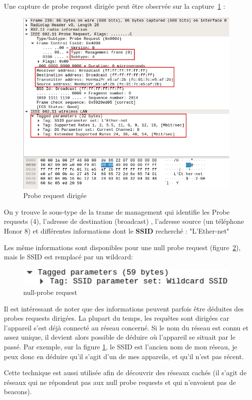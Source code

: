 Une capture de probe request dirigée peut être observée sur la capture~\ref{fig:directedprobe} :
\begin{figure}[H]
	\centering
	\includegraphics[width=14cm]{images/probe/directed_probe.png}
	\caption{Probe request dirigée}
	\label{fig:directedprobe}
\end{figure}

On y trouve le sous-type de la trame de management qui identifie les Probe requests (4), l'adresse de destination (broadcast)
, l'adresse source (un téléphone Honor 8) et différentes informations dont le \textbf{SSID} recherché : "L'Ether-net"

Les même informations sont disponibles pour une null probe request (figure~\ref{fig:nulldprobe}), mais le SSID est remplacé par un wildcard:
\begin{figure}[H]
	\centering
	\includegraphics[width=14cm]{images/probe/null_probe_cropped.png}
	\caption{null-probe request}
	\label{fig:nulldprobe}
\end{figure}

Il est intéressant de noter que des informations peuvent parfois être déduites des probes requests dirigées.
La plupart du temps, les requêtes sont dirigées car l'appareil s'est déjà connecté au réseau concerné. 
Si le nom du réseau est connu et assez unique, il devient alors possible de déduire où l'appareil se situait par le passé.
Par exemple, sur la figure \ref{fig:directedprobe}, le SSID est l'ancien nom de mon réseau, je peux donc en déduire qu'il s'agit
d'un de mes appareils, et qu'il n'est pas récent. 

Cette technique est aussi utilisée afin de découvrir des réseaux cachés (il s'agit de réseaux qui ne répondent pas aux null probe requests et qui n'envoient pas de beacons).

